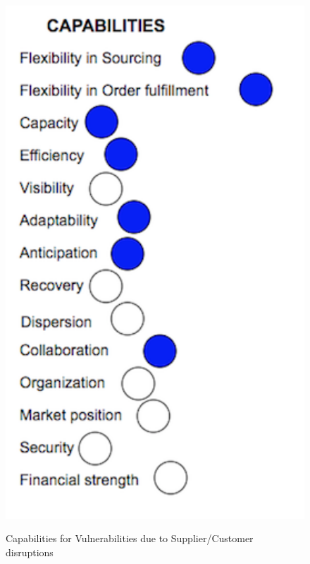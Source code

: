 \begin{figure}[H]
  \centering
  \includegraphics[width=4.5in]{figures/V2.png}\\
  \caption{Capabilities for Vulnerabilities due to Supplier/Customer disruptions}\label{V2}
\end{figure}  

